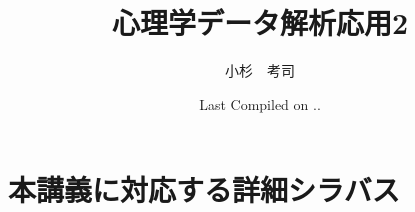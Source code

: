 \documentclass[dvipsnames]{ltjsbook}
\begin{document}


\VerbatimFootnotes
\title{心理学データ解析応用2}
\author{小杉　考司}
\date{Last Compiled on \number\year .\number\month .\number\day}
\maketitle
\setcounter{tocdepth}{1}



\tableofcontents

\linenumbers









\appendix




\chapter{本講義に対応する詳細シラバス}















\nolinenumbers
% 
% 
\printbibliography[title=引用文献]
\printindex
\end{document}
